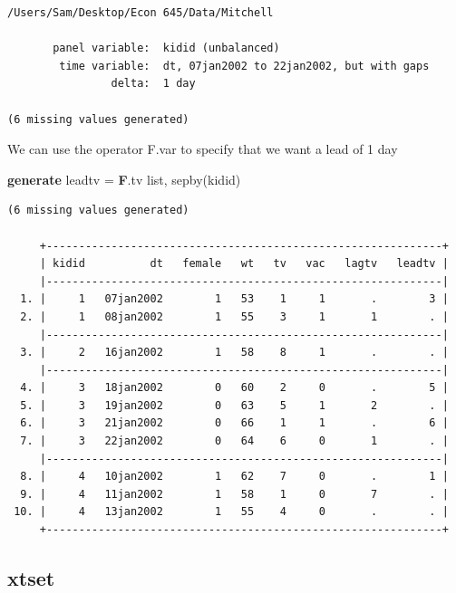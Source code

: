 \documentclass[
]{book}
\newenvironment{Shaded}{\begin{snugshade}}{\end{snugshade}}
\newcommand{\FunctionTok}[1]{\textcolor[rgb]{0.13,0.29,0.53}{\textbf{#1}}}
\newcommand{\KeywordTok}[1]{\textcolor[rgb]{0.13,0.29,0.53}{\textbf{#1}}}
\newcommand{\NormalTok}[1]{#1}
\newcommand{\OtherTok}[1]{\textcolor[rgb]{0.56,0.35,0.01}{#1}}
\begin{document}
\begin{verbatim}
/Users/Sam/Desktop/Econ 645/Data/Mitchell

       panel variable:  kidid (unbalanced)
        time variable:  dt, 07jan2002 to 22jan2002, but with gaps
                delta:  1 day

(6 missing values generated)
\end{verbatim}

We can use the operator F.var to specify that we want a lead of 1 day

\begin{Shaded}
\begin{Highlighting}[]
\KeywordTok{generate}\NormalTok{ leadtv = }\FunctionTok{F}\NormalTok{.tv}
\OtherTok{list}\NormalTok{, sepby(kidid)}
\end{Highlighting}
\end{Shaded}

\begin{verbatim}
(6 missing values generated)

     +-------------------------------------------------------------+
     | kidid          dt   female   wt   tv   vac   lagtv   leadtv |
     |-------------------------------------------------------------|
  1. |     1   07jan2002        1   53    1     1       .        3 |
  2. |     1   08jan2002        1   55    3     1       1        . |
     |-------------------------------------------------------------|
  3. |     2   16jan2002        1   58    8     1       .        . |
     |-------------------------------------------------------------|
  4. |     3   18jan2002        0   60    2     0       .        5 |
  5. |     3   19jan2002        0   63    5     1       2        . |
  6. |     3   21jan2002        0   66    1     1       .        6 |
  7. |     3   22jan2002        0   64    6     0       1        . |
     |-------------------------------------------------------------|
  8. |     4   10jan2002        1   62    7     0       .        1 |
  9. |     4   11jan2002        1   58    1     0       7        . |
 10. |     4   13jan2002        1   55    4     0       .        . |
     +-------------------------------------------------------------+
\end{verbatim}

\subsection*{xtset}\label{xtset}
\end{document}
